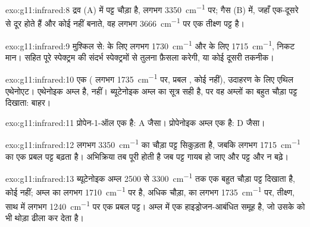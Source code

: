 \begin{solution}{exo:g11:infrared:8}
द्रव (A) में  पट्ट चौड़ा है, लगभग
\qty{3350}{cm^{-1}} पर; गैस (B) में, जहाँ  एक-दूसरे से दूर होते हैं
और कोई  नहीं बनाते, वह लगभग
\qty{3666}{cm^{-1}} पर एक तीक्ष्ण पट्ट है।
\end{solution}

\begin{solution}{exo:g11:infrared:9}
मुश्किल से:  के लिए लगभग \qty{1730}{cm^{-1}} और
 के लिए \qty{1715}{cm^{-1}}, निकट मान।  सहित पूरे
स्पेक्ट्रम की संदर्भ स्पेक्ट्रमों से तुलना
फ़ैसला करेगी, या कोई दूसरी तकनीक।
\end{solution}

\begin{solution}{exo:g11:infrared:10}
एक  ( लगभग \qty{1735}{cm^{-1}} पर, प्रबल , कोई
 नहीं), उदाहरण के लिए एथिल एथेनोएट। एथेनोइक अम्ल  है,
 नहीं। ब्यूटेनोइक अम्ल का सूत्र सही है, पर वह अम्लों का बहुत
चौड़ा  पट्ट दिखाता: बाहर।
\end{solution}

\begin{solution}{exo:g11:infrared:11}
प्रोपेन-1-ऑल एक  है: A जैसा। प्रोपेनोइक अम्ल एक  है:
D जैसा।
\end{solution}

\begin{solution}{exo:g11:infrared:12}
लगभग \qty{3350}{cm^{-1}} का चौड़ा  पट्ट सिकुड़ता है, जबकि
लगभग \qty{1715}{cm^{-1}} का एक प्रबल  पट्ट बढ़ता है। अभिक्रिया तब पूरी होती है
जब  पट्ट गायब हो जाए और  पट्ट और न
बढ़े।
\end{solution}

\begin{solution}{exo:g11:infrared:13}
ब्यूटेनोइक अम्ल 2500 से \qty{3300}{cm^{-1}} तक एक बहुत चौड़ा  पट्ट
दिखाता है,  कोई नहीं; अम्ल का  लगभग
\qty{1710}{cm^{-1}} पर है, अधिक चौड़ा,  का लगभग \qty{1735}{cm^{-1}} पर,
तीक्ष्ण, साथ में लगभग \qty{1240}{cm^{-1}} पर एक प्रबल  पट्ट। अम्ल में
एक हाइड्रोजन-आबंधित  समूह है, जो उसके  को भी
थोड़ा ढीला कर देता है।
\end{solution}

